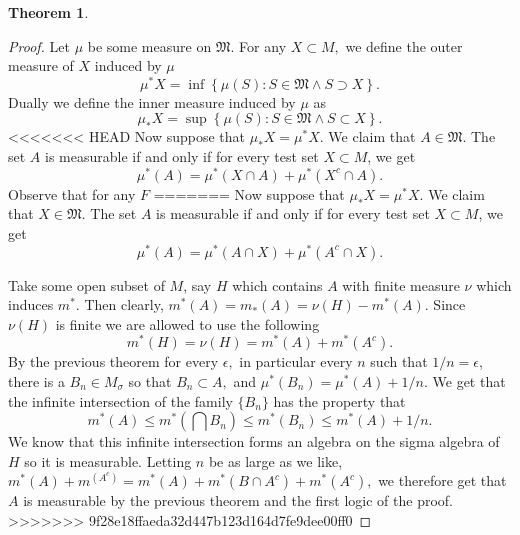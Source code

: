 \documentclass[letter]{article}
\newtheorem{theorem}{Theorem}
\newenvironment{menumerate}{%
  \edef\backupindent{\the\parindent}%
  \enumerate%
  \setlength{\parindent}{\backupindent}%
}{\endenumerate}
\begin{document}
\begin{menumerate}
\begin{theorem}
	\end{theorem}
	\begin{proof}
		Let $\mu$ be some measure on $\mathfrak{M}.$ For any $X \subset M,$ we define
		the outer measure of $X$ induced by $\mu$
		\begin{equation}
			\mu^*X = \inf\left\{\mu(S): S \in \mathfrak{M} \wedge S \supset X\right\}.
		\end{equation}
		Dually we define the inner measure induced by $\mu$ as
		\begin{equation}
				\mu_*X = \sup\left\{\mu(S): S \in \mathfrak{M} \wedge S \subset X\right\}.
		\end{equation}
<<<<<<< HEAD
		Now suppose that $\mu_*X = \mu^*X.$ We claim that $A \in \mathfrak{M}.$ 
		The set $A$ is measurable if and only if for every test set $X \subset M$,
		we get
		\begin{equation}
			\mu^*(A) = \mu^*(X \cap A) + \mu^*(X^c \cap A).
		\end{equation}
		Observe that for any $F$
=======
		Now suppose that $\mu_*X = \mu^*X.$ We claim that $X \in \mathfrak{M}.$ 
		The set $A$ is measurable if and only if for every test set $X \subset M$,
		we get
		\begin{equation}
			\mu^*(A) = \mu^*(A \cap X) + \mu^*(A^c \cap X).
		\end{equation}
		
		Take some open subset of $M$, say $H$ which contains $A$ with finite measure $\nu$ which induces $m^*.$
		Then clearly,
		$m^*(A) = m_*(A) = \nu(H) - m^*(A).$ Since $\nu(H)$ is finite we are allowed to use the following 
		\begin{equation}
			m^*(H) = \nu(H) = m^*(A) + m^*(A^c).
		\end{equation}
		By the previous theorem for every $\epsilon,$ in particular every $n$ such that $1/n = \epsilon$,
		there is a $B_n \in M_\sigma$ so that $B_n \subset A,$ and $\mu^*(B_n) = \mu^*(A) + 1/n.$ 
		We get that the infinite intersection of the family $\{B_n\}$ has the property that
		\begin{equation}
			m^*(A) \leq m^*(\bigcap B_n) \leq m^*(B_n) \leq m^*(A) + 1/n.
		\end{equation}
		We know that this infinite intersection forms an algebra on the sigma algebra of $H$
		so it is measurable. Letting $n$ be as large as we like,
		$m^*(A) + m^(A^c) = m^*(A) + m^*(B\cap A^c) + m^*(A^c),$
		we therefore get that $A$ is measurable by the previous theorem and the first logic of the proof.
>>>>>>> 9f28e18ffaeda32d447b123d164d7fe9dee00ff0
	\end{proof}
\end{menumerate} 
\end{document}
